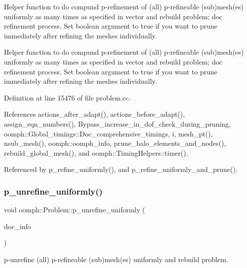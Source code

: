 Helper function to do compund p-\/refinement of (all) p-\/refineable (sub)mesh(es) uniformly as many times as specified in vector and rebuild problem; doc refinement process. Set boolean argument to true if you want to prune immediately after refining the meshes individually. 

Helper function to do compund p-\/refinement of (all) p-\/refineable (sub)mesh(es) uniformly as many times as specified in vector and rebuild problem; doc refinement process. Set boolean argument to true if you want to prune immediately after refining the meshes individually. 

Definition at line 15476 of file problem.\+cc.



References actions\+\_\+after\+\_\+adapt(), actions\+\_\+before\+\_\+adapt(), assign\+\_\+eqn\+\_\+numbers(), Bypass\+\_\+increase\+\_\+in\+\_\+dof\+\_\+check\+\_\+during\+\_\+pruning, oomph\+::\+Global\+\_\+timings\+::\+Doc\+\_\+comprehensive\+\_\+timings, i, mesh\+\_\+pt(), nsub\+\_\+mesh(), oomph\+::oomph\+\_\+info, prune\+\_\+halo\+\_\+elements\+\_\+and\+\_\+nodes(), rebuild\+\_\+global\+\_\+mesh(), and oomph\+::\+Timing\+Helpers\+::timer().



Referenced by p\+\_\+refine\+\_\+uniformly(), and p\+\_\+refine\+\_\+uniformly\+\_\+and\+\_\+prune().

\mbox{\label{classoomph_1_1Problem_a21d8f0ff6813b09f35acbc7a76232397}} 
\subsubsection{\texorpdfstring{p\+\_\+unrefine\+\_\+uniformly()}{p\_unrefine\_uniformly()}\hspace{0.1cm}{\footnotesize\ttfamily [1/2]}}
{\footnotesize\ttfamily void oomph\+::\+Problem\+::p\+\_\+unrefine\+\_\+uniformly (\begin{DoxyParamCaption}\item[{\hyperlink{classoomph_1_1DocInfo}{Doc\+Info} \&}]{doc\+\_\+info }\end{DoxyParamCaption})}



p-\/unrefine (all) p-\/refineable (sub)mesh(es) uniformly and rebuild problem. 

